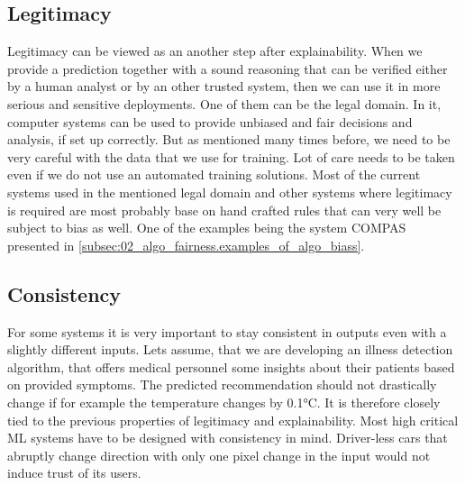 \subsection{Legitimacy}
Legitimacy can be viewed as an another step after explainability. When we provide a prediction together with a sound reasoning that can be verified either by a human analyst or by an other trusted system, then we can use it in more serious and sensitive deployments. One of them can be the legal domain. In it, computer systems can be used to provide unbiased and fair decisions and analysis, if set up correctly. But as mentioned many times before, we need to be very careful with the data that we use for training. Lot of care needs to be taken even if we do not use an automated training solutions. Most of the current systems used in the mentioned legal domain and other systems where legitimacy is required are most probably base on hand crafted rules that can very well be subject to bias as well. One of the examples being the system COMPAS presented in \ref{subsec:02_algo_fairness.examples_of_algo_biass}.




\subsection{Consistency}

For some systems it is very important to stay consistent in outputs even with a slightly different inputs. Lets assume, that we are developing an illness detection algorithm, that offers medical personnel some insights about their patients based on provided symptoms. The predicted recommendation should not drastically change if for example the temperature changes by 0.1°C. It is therefore closely tied to the previous properties of legitimacy and explainability. Most high critical ML systems have to be designed with consistency in mind. Driver-less cars that abruptly change direction with only one pixel change in the input would not induce trust of its users.

